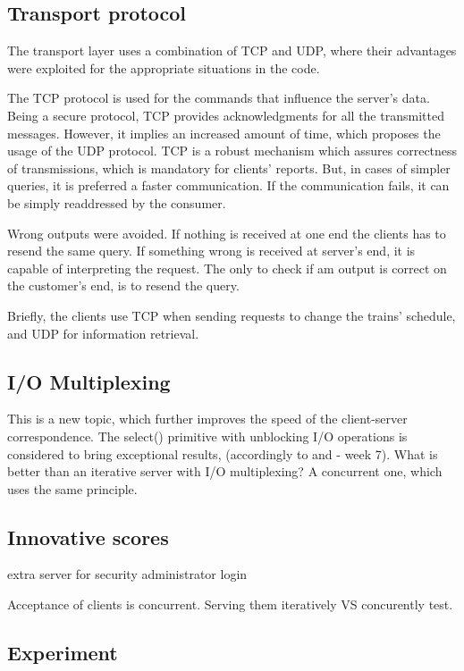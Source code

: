 \documentclass[runningheads]{llncs}
\begin{document}
\subsection{Transport protocol}

The transport layer uses a combination of TCP and UDP, where their advantages were exploited for the appropriate situations in the code.

The TCP protocol is used for the commands that influence the server's data. Being a secure protocol, TCP provides acknowledgments for all the transmitted messages. However, it implies an increased amount of time, which proposes the usage of the UDP protocol. TCP is a robust mechanism which assures correctness of transmissions, which is mandatory for clients' reports. But, in cases of simpler queries, it is preferred a faster communication. If the communication fails, it can be simply readdressed by the consumer.

Wrong outputs were avoided. If nothing is received at one end the clients has to resend the same query. If something wrong is received at server's end, it is capable of interpreting the request. The only to check if am output is correct on the customer's end, is to resend the query.

Briefly, the clients use TCP when sending requests to change the trains' schedule, and UDP for information retrieval.

\subsection{I/O Multiplexing}

This is a new topic, which further improves the speed of the client-server correspondence. The select() primitive with unblocking I/O operations is considered to bring exceptional results, (accordingly to \cite{non-block-select} and \cite{course} - week 7). What is better than an iterative server with I/O multiplexing? A concurrent one, which uses the same principle.

\subsection{Innovative scores}

extra server for security
administrator login

Acceptance of clients is concurrent. Serving them iteratively VS concurently test.

\subsection{Experiment}
\end{document}
